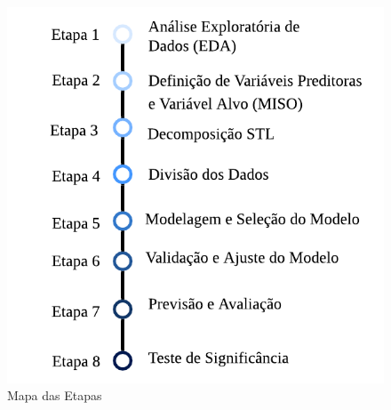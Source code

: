 \begin{figure}[!htb]
	\centering
	\caption{Mapa das Etapas}
	\label{fig:etapas}
	\includegraphics[width=0.7\linewidth]{Introducao/Figuras/Etapas}
	
	
\end{figure}

